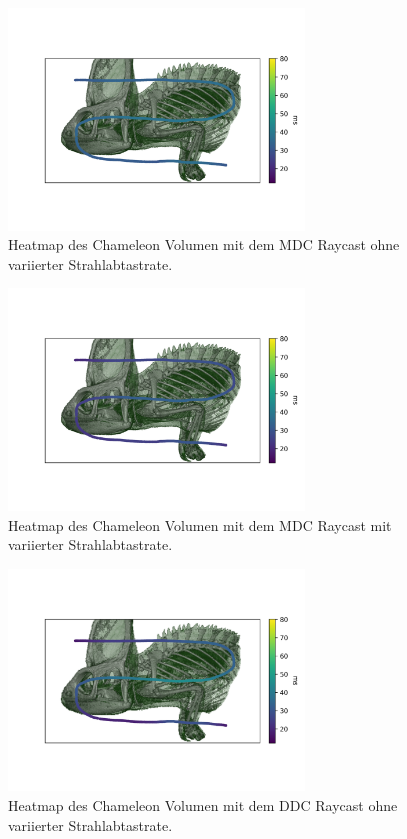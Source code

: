 \begin{figure}
	\centering
	\includegraphics[width=0.7\textwidth]{../../Neue_Messungen/Chameleon/heatmaps/ms_data_mdc_chameleon_heatmap.png}
	\caption{Heatmap des Chameleon Volumen mit dem MDC Raycast ohne variierter Strahlabtastrate.}
	\label{fig::res::pf::hm_mdc}
\end{figure}

\begin{figure}
	\centering
	\includegraphics[width=0.7\textwidth]{../../Neue_Messungen/Chameleon/heatmaps/ms_data_mdc_rORS_chameleon_heatmap.png}
	\caption{Heatmap des Chameleon Volumen mit dem MDC Raycast mit variierter Strahlabtastrate.}
	\label{fig::res::pf::hm_mdc_ors}
\end{figure}

\begin{figure}
	\centering
	\includegraphics[width=0.7\textwidth]{../../Neue_Messungen/Chameleon/heatmaps/ms_data_ddc_chameleon_heatmap.png}
	\caption{Heatmap des Chameleon Volumen mit dem DDC Raycast ohne variierter Strahlabtastrate.}
	\label{fig::res::pf::hm_ddc}
\end{figure}


